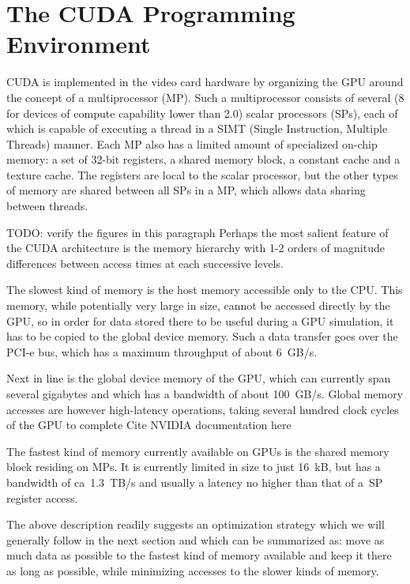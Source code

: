 \documentclass[mathpazo]{cicp}
\begin{document}
\section{The CUDA Programming Environment}


CUDA is implemented in the video card hardware by organizing the GPU around the
concept of a multiprocessor (MP).  Such a multiprocessor consists of several (8 for
devices of compute capability lower than 2.0) scalar processors (SPs), each of which is
capable of executing a thread in a SIMT (Single Instruction, Multiple Threads) manner.
Each MP also has a limited amount of specialized on-chip memory: a set of 32-bit registers,
a shared memory block, a constant cache and a texture cache.  The registers are local
to the scalar processor, but the other types of memory are shared between all SPs
in a MP, which allows data sharing between threads.

{\color{red} TODO: verify the figures in this paragraph}
Perhaps the most salient feature of the CUDA architecture is the memory hierarchy
with 1-2 orders of magnitude differences between access times at each successive levels.

The slowest kind of memory is the host memory accessible only to the CPU.  This memory,
while potentially very large in size, cannot be accessed directly by the GPU, so in order
for data stored there to be useful during a GPU simulation, it has to be copied to the
global device memory.  Such a data transfer goes over the PCI-e bus, which has a maximum
throughput of about 6~GB/s.

Next in line is the global device memory of the GPU, which can currently span several
gigabytes and which has a bandwidth of about 100~GB/s.  Global memory accesses are however
high-latency operations, taking several hundred clock cycles of the GPU to complete {\color{red} Cite NVIDIA documentation here}

The fastest kind of memory currently available on GPUs is the shared memory block residing
on MPs.  It is currently limited in size to just 16~kB, but has a bandwidth of ca~1.3~TB/s
and usually a latency no higher than that of a~SP register access.

The above description readily suggests an optimization strategy which we will generally
follow in the next section and which can be summarized as: move as much data as possible
to the fastest kind of memory available and keep it there as long as possible, while minimizing
accesses to the slower kinds of memory.
\end{document}
